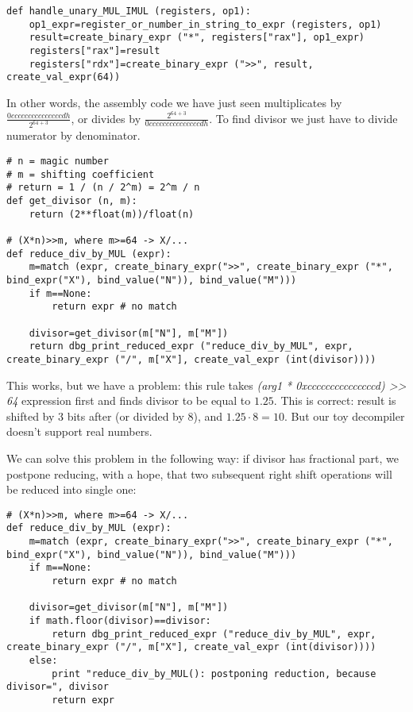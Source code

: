 \begin{lstlisting}
def handle_unary_MUL_IMUL (registers, op1):
    op1_expr=register_or_number_in_string_to_expr (registers, op1)
    result=create_binary_expr ("*", registers["rax"], op1_expr)
    registers["rax"]=result
    registers["rdx"]=create_binary_expr (">>", result, create_val_expr(64))
\end{lstlisting}

In other words, the assembly code we have just seen multiplicates by {\Large $\frac{0cccccccccccccccdh}{2^{64+3}}$},
or divides by {\Large $\frac{2^{64+3}}{0cccccccccccccccdh}$}.
To find divisor we just have to divide numerator by denominator.

\begin{lstlisting}
# n = magic number
# m = shifting coefficient
# return = 1 / (n / 2^m) = 2^m / n
def get_divisor (n, m):
    return (2**float(m))/float(n)

# (X*n)>>m, where m>=64 -> X/...
def reduce_div_by_MUL (expr):
    m=match (expr, create_binary_expr(">>", create_binary_expr ("*", bind_expr("X"), bind_value("N")), bind_value("M")))
    if m==None:
        return expr # no match
    
    divisor=get_divisor(m["N"], m["M"])
    return dbg_print_reduced_expr ("reduce_div_by_MUL", expr, create_binary_expr ("/", m["X"], create_val_expr (int(divisor))))
\end{lstlisting}

This works, but we have a problem: this rule takes \textit{(arg1 * 0xcccccccccccccccd) >> 64} expression first and
finds divisor to be equal to $1.25$.
This is correct: result is shifted by 3 bits after (or divided by 8), and $1.25 \cdot 8 = 10$.
But our toy decompiler doesn't support real numbers.

We can solve this problem in the following way: if divisor has fractional part, we postpone reducing, with a hope,
that two subsequent right shift operations will be reduced into single one:

\begin{lstlisting}
# (X*n)>>m, where m>=64 -> X/...
def reduce_div_by_MUL (expr):
    m=match (expr, create_binary_expr(">>", create_binary_expr ("*", bind_expr("X"), bind_value("N")), bind_value("M")))
    if m==None:
        return expr # no match
    
    divisor=get_divisor(m["N"], m["M"])
    if math.floor(divisor)==divisor:
        return dbg_print_reduced_expr ("reduce_div_by_MUL", expr, create_binary_expr ("/", m["X"], create_val_expr (int(divisor))))
    else:
        print "reduce_div_by_MUL(): postponing reduction, because divisor=", divisor
        return expr
\end{lstlisting}


